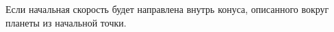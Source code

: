 Если начальная скорость будет направлена внутрь конуса, описанного вокруг планеты из начальной точки.
